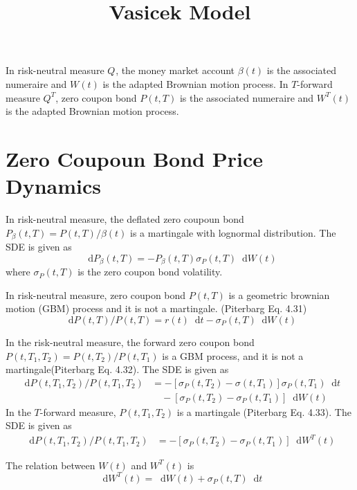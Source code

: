 \documentclass[12pt]{article}
\newcommand{\dd}{\mathop{}\!\text{d}}
\newcommand{\qBrownian}[1]{W(#1)}
\newcommand{\tBrownian}[1]{W^{T}(#1)}
\newcommand{\measure}[1][]{Q^{#1}}
\newcommand{\qMeasure}{\measure}
\newcommand{\TMeasure}{\measure[T]}
\newcommand{\sigmaP}{\sigma_P}
\newcommand{\piterbargEq}[1]{Piterbarg Eq. #1}
\begin{document}
\title{Vasicek Model}
\maketitle

In risk-neutral measure $\qMeasure$, the money market account $\beta(t)$ is the associated
numeraire and $\qBrownian{t}$ is the adapted Brownian motion process. In $T$-forward measure $\TMeasure$,
zero coupon bond $P(t, T)$ is the associated numeraire and $\tBrownian{t}$ is the adapted
Brownian motion process.

\section{Zero Coupoun Bond Price Dynamics}
In risk-neutral measure, the deflated zero coupoun bond $P_{\beta}(t, T) = P(t, T)/\beta(t)$
is a martingale with lognormal distribution. The SDE is given as
\begin{equation}
    \dd P_\beta(t, T)  = - P_\beta(t, T) \sigma_P(t, T) \dd \qBrownian{t}
\end{equation}
where $\sigma_P(t,T)$ is the zero coupon bond volatility.

In risk-neutral measure, zero coupon bond $P(t, T)$ is a geometric brownian motion (GBM)
process and it is not a martingale.
(\piterbargEq{4.31})
\begin{equation}
    \dd P(t, T)/P(t, T) = r(t) \dd t - \sigma_P(t, T) \dd \qBrownian{t}
\end{equation}

In the risk-neutral measure, the forward zero coupon bond
$P(t, T_1, T_2) = P(t, T_2)/P(t, T_1)$ is a GBM process, and
it is not a martingale(\piterbargEq{4.32}).
The SDE is given as
\begin{align}
    \dd P(t, T_1, T_2)/P(t, T_1, T_2)  
    &= -\left[\sigmaP(t, T_2) - \sigma(t, T_1)\right] \sigmaP(t, T_1) \dd t \nonumber \\ 
    &\quad -\left[\sigmaP(t, T_2) - \sigmaP(t, T_1)\right] \dd \qBrownian{t}
\end{align}
In the $T$-forward measure, $P(t, T_1, T_2)$ is a martingale (\piterbargEq{4.33}).
The SDE is given as
\begin{align}
    \label{eq:fwd_bond_sde_T_measure}
    \dd P(t, T_1, T_2)/P(t, T_1, T_2)  
    &= -\left[\sigmaP(t, T_2) - \sigmaP(t, T_1)\right] \dd \tBrownian{t}
\end{align}

The relation between $\qBrownian{t}$ and $\tBrownian{t}$ is
\begin{equation}
    \label{eq:T_measure_relation}
    \dd \tBrownian{t} = \dd \qBrownian{t} + \sigmaP(t, T) \dd t
\end{equation}
\end{document}
